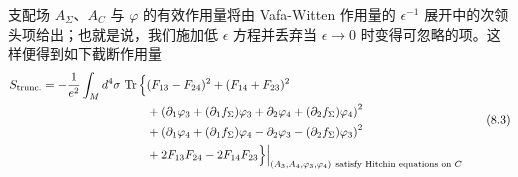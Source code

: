 支配场 $A_\Sigma$、$A_C$ 与 $\varphi$ 的有效作用量将由 Vafa-Witten 作用量的 $\epsilon^{-1}$ 展开中的次领头项给出；也就是说，我们施加低 $\epsilon$ 方程并丢弃当 $\epsilon\to0$ 时变得可忽略的项。这样便得到如下截断作用量
\begin{equation}
\begin{aligned}
S_{\text{trunc.}}=-\frac{1}{e^2}\int_M \dd^4\sigma\,\Tr\Big\{&(F_{13}-F_{24})^2+(F_{14}+F_{23})^2\\
&+\left(\partial_1\varphi_3+(\partial_1f_\Sigma)\varphi_3+\partial_2\varphi_4+(\partial_2f_\Sigma)\varphi_4\right)^2\\
&+\left(\partial_1\varphi_4+(\partial_1f_\Sigma)\varphi_4-\partial_2\varphi_3-(\partial_2f_\Sigma)\varphi_3\right)^2\\
&+2F_{13}F_{24}-2F_{14}F_{23}\Big\}\Big|_{(A_3,A_4,\varphi_3,\varphi_4)\ \text{satisfy Hitchin equations on }C}
\end{aligned}
\tag{8.3}
\end{equation}
